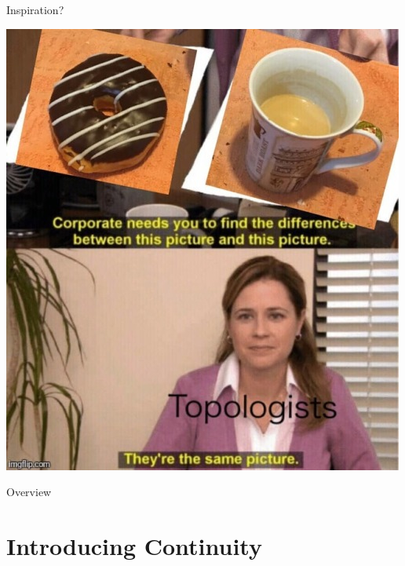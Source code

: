 \documentclass[aspectratio=169,xcolor=dvipsnames]{beamer}
\title[Introducing]
\subtitle{}
\author[Kasra M] {Kasra M}
\date{\today} %
\begin{document}
\begin{frame}
    \titlepage
\end{frame}
\begin{frame}{Inspiration?}
\begin{center}
    \includegraphics[scale = 0.25]{topology}
\end{center}
\end{frame}
\begin{frame}{Overview}
    \tableofcontents
\end{frame}

\section{Introducing Continuity}
\end{document}
